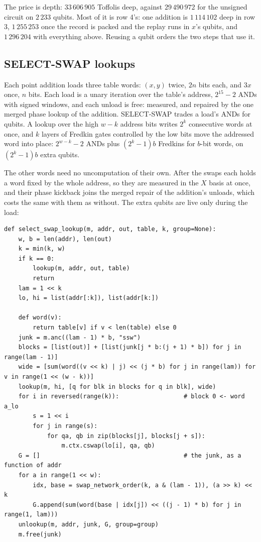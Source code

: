 \documentclass[11pt]{article}
\theoremstyle{plain}
\theoremstyle{remark}
\begin{document}
The price is depth: $33\,606\,905$ Toffolis deep, against $29\,490\,972$ for the unsigned circuit
on $2\,233$ qubits. Most of it is row 4's: one addition is $1\,114\,102$ deep in row 3,
$1\,255\,253$ once the record is packed and the replay runs in $x$'s qubits, and $1\,296\,204$ with
everything above. Reusing a qubit orders the two steps that use it.

\subsection{SELECT-SWAP lookups}\label{ec:sec:ssw}

Each point addition loads three table words: $(x,y)$ twice, $2n$ bits each, and $3x$ once, $n$ bits.
Each load is a unary iteration over the table's address, $2^{15}-2$ ANDs with signed windows, and
each unload is free: measured, and repaired by the one merged phase lookup of the addition.
SELECT-SWAP \cite{ec:lks18} trades a load's ANDs for qubits. A lookup over the high $w-k$ address
bits writes $2^k$ consecutive words at once, and $k$ layers of Fredkin gates controlled by the low
bits move the addressed word into place: $2^{w-k}-2$ ANDs plus $(2^k-1)b$ Fredkins for $b$-bit
words, on $(2^k-1)b$ extra qubits.

The other words need no uncomputation of their own. After the swaps each holds a word fixed by the
whole address, so they are measured in the $X$ basis at once, and their phase kickback joins the
merged repair of the addition's unloads, which costs the same with them as without. The extra
qubits are live only during the load:
\begin{lstlisting}
def select_swap_lookup(m, addr, out, table, k, group=None):
    w, b = len(addr), len(out)
    k = min(k, w)
    if k == 0:
        lookup(m, addr, out, table)
        return
    lam = 1 << k
    lo, hi = list(addr[:k]), list(addr[k:])

    def word(v):
        return table[v] if v < len(table) else 0
    junk = m.anc((lam - 1) * b, "ssw")
    blocks = [list(out)] + [list(junk[j * b:(j + 1) * b]) for j in range(lam - 1)]
    wide = [sum(word((v << k) | j) << (j * b) for j in range(lam)) for v in range(1 << (w - k))]
    lookup(m, hi, [q for blk in blocks for q in blk], wide)
    for i in reversed(range(k)):                  # block 0 <- word a_lo
        s = 1 << i
        for j in range(s):
            for qa, qb in zip(blocks[j], blocks[j + s]):
                m.ctx.cswap(lo[i], qa, qb)
    G = []                                        # the junk, as a function of addr
    for a in range(1 << w):
        idx, base = swap_network_order(k, a & (lam - 1)), (a >> k) << k
        G.append(sum(word(base | idx[j]) << ((j - 1) * b) for j in range(1, lam)))
    unlookup(m, addr, junk, G, group=group)
    m.free(junk)
\end{lstlisting}
\end{document}
